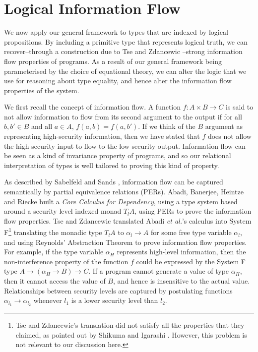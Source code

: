 \section{Logical Information Flow}
\label{sec:information-flow}

\newcommand{\infoflow}{\mathit{Log}}

We now apply our general framework to types that are indexed by
logical propositions. By including a primitive type that represents
logical truth, we can recover--through a construction due to Tse and
Zdancewic \cite{tse04translating}--strong information flow properties
of programs. As a result of our general framework being parameterised
by the choice of equational theory, we can alter the logic that we use
for reasoning about type equality, and hence alter the information
flow properties of the system. 

We first recall the concept of information flow. A function $f : A
\times B \to C$ is said to not allow information to flow from its
second argument to the output if for all $b,b' \in B$ and all $a \in
A$, $f(a,b) = f(a,b')$. If we think of the $B$ argument as
representing high-security information, then we have stated that $f$
does not allow the high-security input to flow to the low security
output. Information flow can be seen as a kind of invariance property
of programs, and so our relational interpretation of types is well
tailored to proving this kind of property.

As described by Sabelfeld and Sands \cite{sabelfeld01per}, information
flow can be captured semantically by partial equivalence relations
(PERs). Abadi, Banerjee, Heintze and Riecke \cite{abadi99core} built a
\emph{Core Calculus for Dependency}, using a type system based around
a security level indexed monad $T_lA$, using PERs to prove the
information flow properties. Tse and Zdancewic \cite{tse04translating}
translated Abadi \emph{et al.}'s calculus into System F\footnote{Tse
  and Zdancewic's translation did not satisfy all the properties that
  they claimed, as pointed out by Shikuma and Igarashi
  \cite{shikuma08proving}. However, this problem is not relevant to
  our discussion here.} translating the monadic type $T_lA$ to
$\alpha_l \to A$ for some free type variable $\alpha_l$, and using
Reynolds' Abstraction Theorem to prove information flow
properties. For example, if the type variable $\alpha_H$ represents
high-level information, then the non-interference property of the
function $f$ could be expressed by the System F type $A \to (\alpha_H
\to B) \to C$. If a program cannot generate a value of type
$\alpha_H$, then it cannot access the value of $B$, and hence is
insensitive to the actual value. Relationships between security levels
are captured by postulating functions $\alpha_{l_1} \to \alpha_{l_2}$
whenever $l_1$ is a lower security level than $l_2$.

